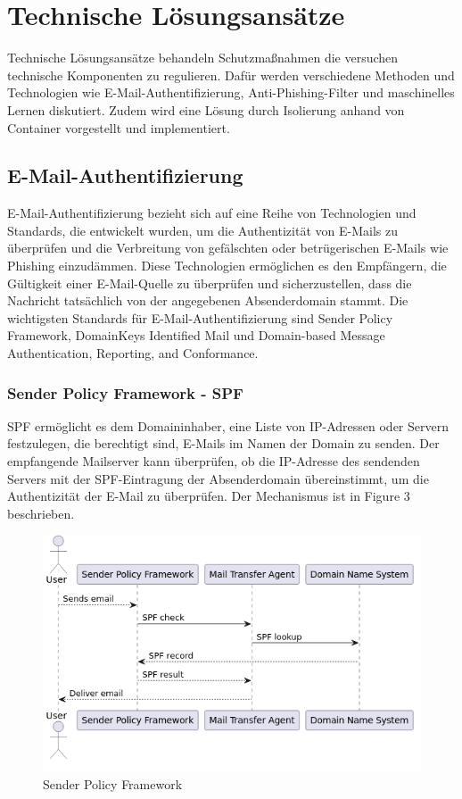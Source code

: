 \documentclass[journal=tosc,final]{iacrtrans}
\begin{document}
\newpage
\section{Technische Lösungsansätze}
Technische Lösungsansätze behandeln Schutzmaßnahmen die versuchen technische Komponenten zu regulieren. Dafür werden verschiedene Methoden und Technologien wie E-Mail-Authentifizierung, Anti-Phishing-Filter und maschinelles Lernen diskutiert. Zudem wird eine Lösung durch Isolierung anhand von Container vorgestellt und implementiert. 
\subsection{E-Mail-Authentifizierung}
E-Mail-Authentifizierung bezieht sich auf eine Reihe von Technologien und Standards, die entwickelt wurden, um die Authentizität von E-Mails zu überprüfen und die Verbreitung von gefälschten oder betrügerischen E-Mails wie Phishing einzudämmen. Diese Technologien ermöglichen es den Empfängern, die Gültigkeit einer E-Mail-Quelle zu überprüfen und sicherzustellen, dass die Nachricht tatsächlich von der angegebenen Absenderdomain stammt. Die wichtigsten Standards für E-Mail-Authentifizierung sind Sender Policy Framework, DomainKeys Identified Mail und Domain-based Message Authentication, Reporting, and Conformance.
\subsubsection{Sender Policy Framework - SPF}
SPF ermöglicht es dem Domaininhaber, eine Liste von IP-Adressen oder Servern festzulegen, die berechtigt sind, E-Mails im Namen der Domain zu senden. Der empfangende Mailserver kann überprüfen, ob die IP-Adresse des sendenden Servers mit der SPF-Eintragung der Absenderdomain übereinstimmt, um die Authentizität der E-Mail zu überprüfen. Der Mechanismus ist in Figure 3 beschrieben.

 \begin{figure}[h]
\centering  \caption{Sender Policy Framework}
  \includegraphics[scale=0.5]{spf.png}
 \end{figure}
\end{document}
